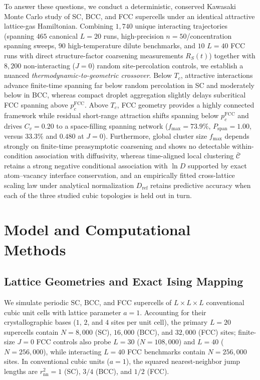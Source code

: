 \documentclass[aps,pre,reprint,superscriptaddress,amsmath,amssymb,floatfix]{revtex4-2}
\begin{document}
To answer these questions, we conduct a deterministic, conserved Kawasaki Monte Carlo study of SC, BCC, and FCC supercells under an identical attractive lattice-gas Hamiltonian. Combining $1{,}740$ unique interacting trajectories (spanning $465$ canonical $L=20$ runs, high-precision $n=50$/concentration spanning sweeps, $90$ high-temperature dilute benchmarks, and $10$ $L=40$ FCC runs with direct structure-factor coarsening measurements $R_S(t)$) together with $8{,}200$ non-interacting ($J=0$) random site-percolation controls, we establish a nuanced \emph{thermodynamic-to-geometric crossover}. Below $T_c$, attractive interactions advance finite-time spanning far below random percolation in SC and moderately below in BCC, whereas compact droplet aggregation slightly delays subcritical FCC spanning above $p_c^{\mathrm{FCC}}$. Above $T_c$, FCC geometry provides a highly connected framework while residual short-range attraction shifts spanning below $p_c^{\mathrm{FCC}}$ and drives $C_v = 0.20$ to a space-filling spanning network ($f_{\max} = 73.9\%$, $P_{\mathrm{span}} = 1.00$, versus $33.3\%$ and $0.480$ at $J = 0$). Furthermore, global cluster size $f_{\max}$ depends strongly on finite-time preasymptotic coarsening and shows no detectable within-condition association with diffusivity, whereas time-aligned local clustering $\bar{\mathcal{C}}$ retains a strong negative conditional association with $\ln D$ supported by exact atom--vacancy interface conservation, and an empirically fitted cross-lattice scaling law under analytical normalization $D_{\mathrm{ref}}$ retains predictive accuracy when each of the three studied cubic topologies is held out in turn.

\section{Model and Computational Methods}
\label{sec:methods}

\subsection{Lattice Geometries and Exact Ising Mapping}
\label{sec:lattice_models}

We simulate periodic SC, BCC, and FCC supercells of $L \times L \times L$ conventional cubic unit cells with lattice parameter $a = 1$. Accounting for their crystallographic bases ($1$, $2$, and $4$ sites per unit cell), the primary $L = 20$ supercells contain $N = 8{,}000$ (SC), $16{,}000$ (BCC), and $32{,}000$ (FCC) sites; finite-size $J=0$ FCC controls also probe $L = 30$ ($N = 108{,}000$) and $L = 40$ ($N = 256{,}000$), while interacting $L = 40$ FCC benchmarks contain $N = 256{,}000$ sites. In conventional cubic units ($a = 1$), the squared nearest-neighbor jump lengths are $r_{\mathrm{nn}}^2 = 1$ (SC), $3/4$ (BCC), and $1/2$ (FCC).
\end{document}
